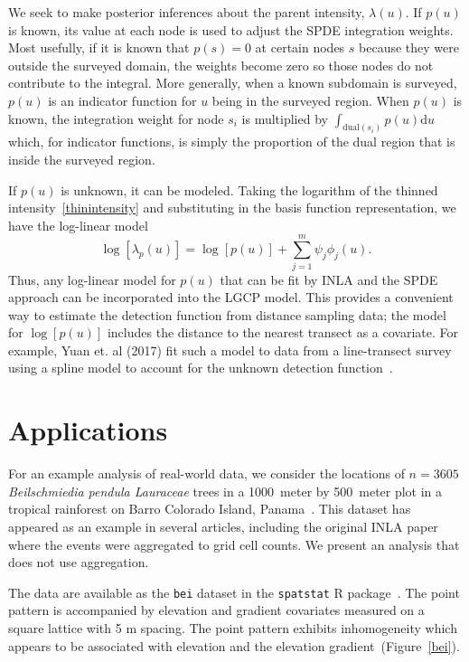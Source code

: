 \documentclass{interact}
\begin{document}
We seek to make posterior inferences about the parent intensity,
\(\lambda(u)\). If \(p(u)\) is known, its value at each node is used to
adjust the SPDE integration weights. Most usefully, if it is known that
\(p(s) = 0\) at certain nodes \(s\) because they were outside the surveyed
domain, the weights become zero so those nodes do not contribute to the
integral. More generally, when a known subdomain is surveyed, \(p(u)\) is
an indicator function for \(u\) being in the surveyed region. When \(p(u)\)
is known, the integration weight for node \(s_{i}\) is multiplied by
\(\int_{\mathrm{dual}(s_{i})} p(u) \mathrm{d}u\)
which, for indicator functions, is simply the proportion of the dual region
that is inside the surveyed region.

If \(p(u)\) is unknown, it can be modeled. Taking the logarithm of the thinned
intensity~\eqref{thinintensity} and substituting in the basis function
representation, we have the log-linear model
\begin{equation}
\log\left[\lambda_{p}(u)\right]
= \log\left[p(u)\right] + \sum_{j = 1}^{m} \psi_{j} \phi_{j}(u).
\end{equation}
Thus, any log-linear model for \(p(u)\) that can be fit by INLA and the SPDE
approach can be incorporated into the LGCP model. This provides a convenient
way to estimate the detection function from distance sampling data; the model
for \(\log[p(u)]\) includes the distance to the nearest transect as a
covariate. For example, Yuan et. al (2017) fit such a model to data from a
line-transect survey using a spline model to account for the unknown detection
function~\cite{yuanetal}.


\section{Applications}
\label{application}

For an example analysis of real-world data, we consider the locations of
\(n = 3605\) \emph{Beilschmiedia pendula Lauraceae} trees in a 1000~meter by
500~meter plot in a tropical rainforest on Barro Colorado Island,
Panama~\cite{moellerwaagepetersen}. This dataset has appeared as an example
in several articles, including the original INLA paper where the events were
aggregated to grid cell counts. We present an analysis that does not use
aggregation.

The data are available as the \texttt{bei} dataset in the \texttt{spatstat} R
package~\cite{spatstat}. The point pattern is accompanied by elevation and
gradient covariates measured on a square lattice with 5 m spacing. The point
pattern exhibits inhomogeneity which appears to be associated with elevation
and the elevation gradient~(Figure~\ref{bei}).
\end{document}
